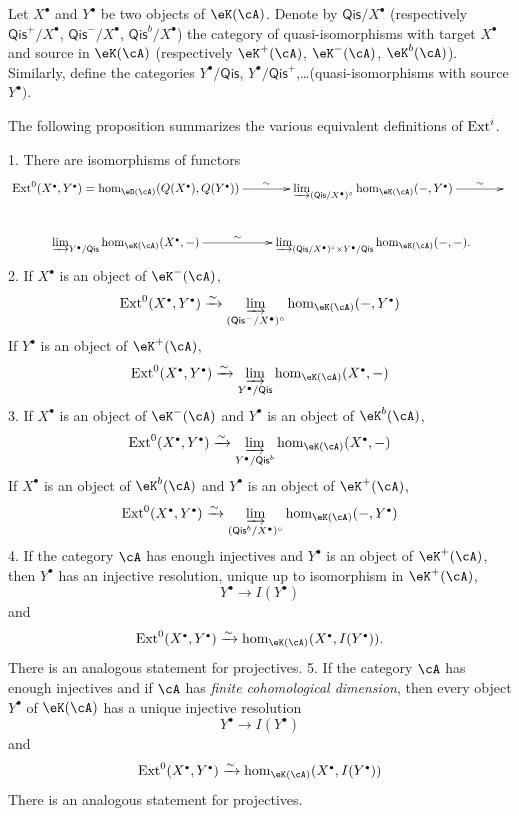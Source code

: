 Let $X^\bullet$ and $Y^\bullet$ be two objects of $\eK(\cA)$. Denote by
$\mathsf{Qis}/X^\bullet$ (respectively $\mathsf{Qis}^+/X^\bullet$,
$\mathsf{Qis}^-/X^\bullet$, $\mathsf{Qis}^b/X^\bullet$) the category of
quasi-isomorphisms with target $X^\bullet$ and source in $\eK(\cA)$
(respectively $\eK^+(\cA)$, $\eK^-(\cA)$, $\eK^b(\cA)$). Similarly,
define the categories $Y^\bullet/\mathsf{Qis}$,
$Y^\bullet/\mathsf{Qis}^+$,\ldots (quasi-isomorphisms with source
$Y^\bullet)$.

The following proposition summarizes the various equivalent definitions
of $\operatorname{Ext}^i$.

\begin{proposition}\label{VIII:3-2-3}
1. There are isomorphisms of functors
\[\xymatrix{
  \ext^0(X^\bullet,Y^\bullet) = \hom_{\eD(\cA)}(Q(X^\bullet),Q(Y^\bullet)) \ar[r]^-\sim
    & \varinjlim_{(\mathsf{Qis}/X^\bullet)^\circ} \hom_{\eK(\cA)}(-,Y^\bullet) \ar[r]^-\sim
    & \\
  \varinjlim_{Y^\bullet/\mathsf{Qis}} \hom_{\eK(\cA)}(X^\bullet,-) \ar[r]^-\sim
    & \varinjlim_{(\mathsf{Qis}/X^\bullet)^\circ \times Y^\bullet/\mathsf{Qis}} \hom_{\eK(\cA)}(-,-) \text{.}
}\]
2. If $X^\bullet$ is an object of $\eK^-(\cA)$,
\[
  \ext^0(X^\bullet,Y^\bullet) \iso \varinjlim_{(\mathsf{Qis}^-/X^\bullet)^\circ} \hom_{\eK(\cA)}(-,Y^\bullet)
\]
If $Y^\bullet$ is an object of $\eK^+(\cA)$,
\[
  \ext^0(X^\bullet,Y^\bullet) \iso \varinjlim_{Y^\bullet/\mathsf{Qis}} \hom_{\eK(\cA)}(X^\bullet,-)
\]
3. If $X^\bullet$ is an object of $\eK^-(\cA)$ and $Y^\bullet$ is an object
of $\eK^b(\cA)$,
\[
  \ext^0(X^\bullet,Y^\bullet) \iso \varinjlim_{Y^\bullet/\mathsf{Qis}^b} \hom_{\eK(\cA)}(X^\bullet,-)
\]
If $X^\bullet$ is an object of $\eK^b(\cA)$ and $Y^\bullet$ is an object
of $\eK^+(\cA)$,
\[
  \ext^0(X^\bullet,Y^\bullet) \iso \varinjlim_{(\mathsf{Qis}^b/X^\bullet)^\circ} \hom_{\eK(\cA)}(-,Y^\bullet)
\]
4. If the category $\cA$ has enough injectives and $Y^\bullet$ is an object
of $\eK^+(\cA)$, then $Y^\bullet$ has an injective resolution, unique up
to isomorphism in $\eK^+(\cA)$,
\[
  Y^\bullet \to I(Y^\bullet)
\]
and
\[
  \ext^0(X^\bullet,Y^\bullet) \iso \hom_{\eK(\cA)}(X^\bullet,I(Y^\bullet)) \text{.}
\]
There is an analogous statement for projectives.
5. If the category $\cA$
has enough injectives and if $\cA$ has \emph{finite cohomological dimension}, then
every object $Y^\bullet$ of $\eK(\cA)$ has a unique injective resolution
\[
  Y^\bullet \to I(Y^\bullet)
\]
and
\[
  \ext^0(X^\bullet,Y^\bullet) \iso \hom_{\eK(\cA)}(X^\bullet,I(Y^\bullet))
\]
There is an analogous statement for projectives.
\end{proposition}

